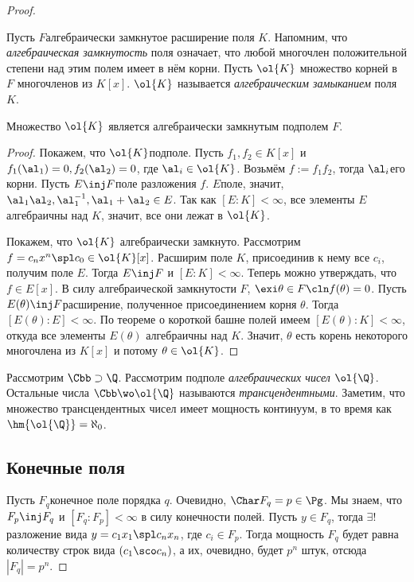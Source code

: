 \documentclass[a4paper]{article}
\begin{document}
\begin{proof}
\begin{df}
Пусть $F$\т алгебраически замкнутое расширение поля $K$. Напомним, что  \emph{алгебраическая замкнутость}
поля означает, что любой многочлен положительной степени над этим полем имеет в нём корни. Пусть $\ol{K}$\т
множество корней в $F$ многочленов из $K[x]$. $\ol{K}$ называется \emph{алгебраическим замыканием} поля $K$.
\end{df}

\begin{theorem}
Множество $\ol{K}$ является алгебраически замкнутым подполем $F$.
\end{theorem}
\begin{proof}
Покажем, что $\ol{K}$\т подполе. Пусть $f_1, f_2\in K[x]$ и  $f_1(\al_1)=0, f_2(\al_2)=0$, где $\al_i \in
\ol{K}$. Возьмём $f:=f_1f_2$, тогда $\al_i$\т его корни. Пусть $E \inj F$\т поле разложения $f$. $E$\т поле,
значит, $\al_1\al_2, \al_1^{-1}, \al_1 + \al_2 \in E$. Так как $[E:K]<\infty$, все элементы $E$ алгебраичны
над $K$, значит, все они лежат в $\ol{K}$.

Покажем, что $\ol{K}$ алгебраически замкнуто. Рассмотрим  $f = c_nx^n \spl c_0 \in \ol{K}[x]$.  Расширим поле
$K$, присоединив к нему все $c_i$, получим поле $E$. Тогда $E \inj F$ и $[E:K] < \infty$. Теперь можно
утверждать, что $f \in E[x]$. В силу алгебраической замкнутости $F$, $\exi \theta \in F\cln f(\theta)=0$. Пусть
$E(\theta) \inj F$\т расширение, полученное присоединением корня $\theta$. Тогда $[E(\theta):E]< \infty$. По
теореме о короткой башне полей имеем $[E(\theta):K]< \infty$, откуда все элементы $E(\theta)$ алгебраичны над
$K$. Значит, $\theta$ есть корень некоторого многочлена из $K[x]$ и потому $\theta \in \ol{K}$.
\end{proof}

\begin{ex}
Рассмотрим $\Cbb \supset \Q$. Рассмотрим подполе \emph{алгебраических чисел}  $\ol{\Q}$. Остальные числа
$\Cbb \wo \ol{\Q}$ называются \emph{трансцендентными}. Заметим, что множество трансцендентных чисел имеет
мощность континуум, в то время как $\hm{\ol{\Q}}=\aleph_0$.
\end{ex}

\subsection{Конечные поля}

Пусть $F_q$\т конечное поле порядка $q$. Очевидно,  $\Char F_q = p \in \Pg$. Мы знаем, что $F_p \inj F_q$ и
$[F_q:F_p] < \infty$ в силу конечности полей. Пусть $y \in F_q$, тогда $\exi!$ разложение вида $y=c_1x_1 \spl
c_nx_n$, где $c_i \in F_p$. Тогда мощность $F_q$ будет равна количеству строк вида $(c_1\sco c_n)$, а их,
очевидно, будет $p^n$ штук, отсюда $|F_q|=p^n$.


\end{proof}
\end{document}
